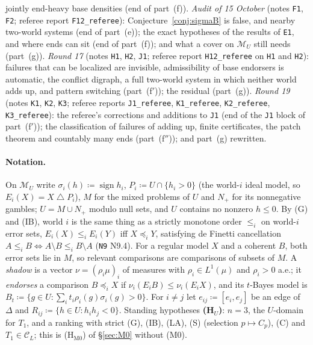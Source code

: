\documentclass[11pt]{article}
\theoremstyle{definition}
\theoremstyle{remark}
\newcommand{\M}{\mathcal M}
\newcommand{\C}{\mathcal C}
\newcommand{\sd}{\mathbin{\triangle}}
\newcommand{\src}[1]{\texttt{#1}}
\begin{document}
jointly end-heavy base densities (end of part~(f)). \emph{Audit of 15 October} (notes \src{F1}, \src{F2}; referee report \src{F12\_referee}): Conjecture~\ref{conj:sigmaB} is false, and nearby two-world systems (end of part~(e)); the exact hypotheses of the results of \src{E1}, and where ends can sit (end of part~(f)); and what a cover on $\M_U$ still needs (part~(g)). \emph{Round 17} (notes \src{H1}, \src{H2}, \src{J1}; referee report \src{H12\_referee} on \src{H1} and \src{H2}): failures that can be localized are invisible, admissibility of base endorsers is automatic, the conflict digraph, a full two-world system in which neither world adds up, and pattern switching (part~(f$'$)); the residual (part~(g)). \emph{Round 19} (notes \src{K1}, \src{K2}, \src{K3}; referee reports \src{J1\_referee}, \src{K1\_referee}, \src{K2\_referee}, \src{K3\_referee}): the referee's corrections and additions to \src{J1} (end of the \src{J1} block of part~(f$'$)); the classification of failures of adding up, finite certificates, the patch theorem and countably many ends (part~(f$''$)); and part~(g) rewritten.

\paragraph{Notation.} On $\M_U$ write $\sigma_i(h)\coloneqq\operatorname{sign}h_i$, $P_i\coloneqq U\cap\{h_i>0\}$ (the world-$i$ ideal model, so $E_i(X)=X\sd P_i$), $M$ for the mixed problems of $U$ and $N_+$ for its nonnegative gambles; $U=M\cup N_+$ modulo null sets, and $U$ contains no nonzero $h\le0$. By (G) and (IB), world $i$ is the same thing as a strictly monotone order $\le_i$ on world-$i$ error sets, $E_i(X)\le_iE_i(Y)$ iff $X\preceq_iY$, satisfying de Finetti cancellation $A\le_iB\iff A\setminus B\le_iB\setminus A$ (\src{N9} N9.4). For a regular model $X$ and a coherent $B$, both error sets lie in $M$, so relevant comparisons are comparisons of subsets of $M$. A \emph{shadow} is a vector $\nu=(\rho_i\mu)_i$ of measures with $\rho_i\in L^1(\mu)$ and $\rho_i>0$ a.e.; it \emph{endorses} a comparison $B\preceq_iX$ if $\nu_i(E_iB)\le\nu_i(E_iX)$, and its $t$-Bayes model is $B_t\coloneqq\{g\in U:\sum_it_i\rho_i(g)\sigma_i(g)>0\}$. For $i\ne j$ let $e_{ij}\coloneqq[e_i,e_j]$ be an edge of $\Delta$ and $R_{ij}\coloneqq\{h\in U:h_ih_j<0\}$. Standing hypotheses \textbf{(H$_U$)}: $n=3$, the $U$-domain for $T_1$, and a ranking with strict (G), (IB), (LA), (S) (selection $p\mapsto C_p$), (C) and $T_1\in\C_L$; this is (H$_{\mathrm{M0}}$) of \S\ref{sec:M0} without (M0).
\end{document}
